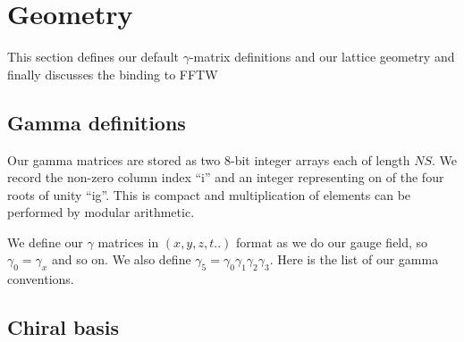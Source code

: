 \section{Geometry}

This section defines our default $\gamma$-matrix definitions and our lattice
geometry and finally discusses the binding to FFTW \cite{} %

\subsection{Gamma definitions}

Our gamma matrices are stored as two 8-bit integer arrays each of length $NS$.
We record the non-zero column index ``i'' and an integer representing on of the
four roots of unity ``ig''. This is compact and multiplication of elements can
be performed by modular arithmetic.

We define our $\gamma$ matrices in $(x,y,z,t..)$ format as we do our gauge
field, so $\gamma_0=\gamma_x$ and so on. We also define 
$\gamma_5=\gamma_0\gamma_1\gamma_2\gamma_3$. Here is the list of our gamma
conventions.

\subsection{Chiral basis}

